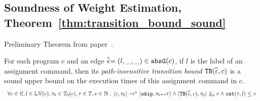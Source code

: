 \subsection{Soundness of Weight Estimation, Theorem~\ref{thm:transition_bound_sound}}
  \label{apdx:weight_soundness}
  Preliminary Theorem from paper~\cite{sinn2017complexity}.
  \begin{thm}
  For each program ${c}$ and an edge $\stackrel{\scriptscriptstyle{\alpha}}{\mathtt{\epsilon}{}} = (l, \_, \_) \in \mathtt{abs}{\mathtt{G}}(c)$, if $l$ is the label of an assignment command,
  then its \emph{path-insensitive transition bound} ${\mathtt{TB}}(\stackrel{\scriptscriptstyle{\alpha}}{\mathtt{\epsilon}{}}, c)$ 
   is a sound upper bound on 
  the execution times of this assignment command in $c$.
    \[
      \begin{array}{l}
        \forall c \in \mathcal{C}, l \in \mathbb{LV}(c),\mathtt{\tau}_0 \in \mathcal{T}_0(c), 
        \mathtt{\tau} \in \mathcal{T}, v \in \mathbb{N}
         ~.~ 
         \langle {c}, \mathtt{\tau}_0 \rangle \to^{*} \langle \mathtt{skip}, \mathtt{\tau}_0{\scriptscriptstyle ++}\mathtt{\tau} \rangle 
         \land \langle {\ensuremath{\mathtt{TB}}}(\stackrel{\scriptscriptstyle{\alpha}}{\mathtt{\epsilon}{}}, c), \mathtt{\tau}_0 \rangle \Downarrow_a v
         \land
        \mathtt{cnt}(\mathtt{\tau}, l) \leq v
      \end{array}
      \]
  \end{thm}


